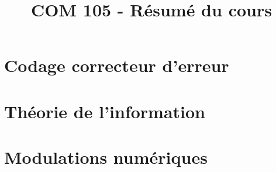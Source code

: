 \documentclass[a4paper,9pt]{article}
\title{\vspace{-1.2cm} COM 105 - Résumé du cours}
\begin{document}
\maketitle

\vspace{-1.5cm}

\section{Codage correcteur d'erreur}

	

\section{Théorie de l'information}

	

\section{Modulations numériques}

	
\end{document}
